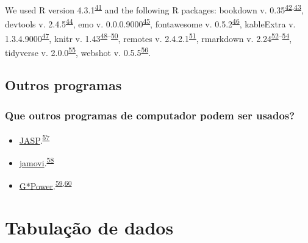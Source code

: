 \documentclass[
]{book}
\begin{document}
We used R version 4.3.1\textsuperscript{\protect\hyperlink{ref-base}{41}} and the following R packages: bookdown v. 0.35\textsuperscript{\protect\hyperlink{ref-bookdown2016}{42},\protect\hyperlink{ref-bookdown2023}{43}}, devtools v. 2.4.5\textsuperscript{\protect\hyperlink{ref-devtools}{44}}, emo v. 0.0.0.9000\textsuperscript{\protect\hyperlink{ref-emo}{45}}, fontawesome v. 0.5.2\textsuperscript{\protect\hyperlink{ref-fontawesome}{46}}, kableExtra v. 1.3.4.9000\textsuperscript{\protect\hyperlink{ref-kableExtra}{47}}, knitr v. 1.43\textsuperscript{\protect\hyperlink{ref-knitr2014}{48}--\protect\hyperlink{ref-knitr2023}{50}}, remotes v. 2.4.2.1\textsuperscript{\protect\hyperlink{ref-remotes}{51}}, rmarkdown v. 2.24\textsuperscript{\protect\hyperlink{ref-rmarkdown2018}{52}--\protect\hyperlink{ref-rmarkdown2023}{54}}, tidyverse v. 2.0.0\textsuperscript{\protect\hyperlink{ref-tidyverse}{55}}, webshot v. 0.5.5\textsuperscript{\protect\hyperlink{ref-webshot}{56}}.

\hypertarget{outros-programas}{%
\section{Outros programas}\label{outros-programas}}

\hypertarget{que-outros-programas-de-computador-podem-ser-usados}{%
\subsection{Que outros programas de computador podem ser usados?}\label{que-outros-programas-de-computador-podem-ser-usados}}

\begin{itemize}
\item
  \href{https://jasp-stats.org}{JASP}.\textsuperscript{\protect\hyperlink{ref-love2019}{57}}
\item
  \href{https://www.jamovi.org}{jamovi}.\textsuperscript{\protect\hyperlink{ref-sahin2020}{58}}
\item
  \href{https://www.psychologie.hhu.de/arbeitsgruppen/allgemeine-psychologie-und-arbeitspsychologie/gpower}{G*Power}.\textsuperscript{\protect\hyperlink{ref-Faul2007}{59},\protect\hyperlink{ref-Faul2009}{60}}
\end{itemize}

\hypertarget{tabulacao-dados}{%
\chapter{\texorpdfstring{\textbf{Tabulação de dados}}{Tabulação de dados}}\label{tabulacao-dados}}
\end{document}

